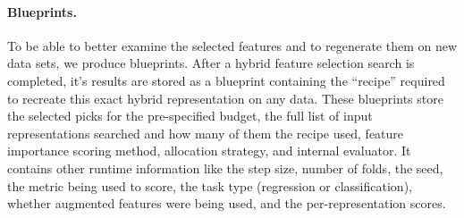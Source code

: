 \paragraph{Blueprints.}

To be able to better examine the selected features and to regenerate them on new data sets, we produce blueprints. After a hybrid feature selection search is completed, it's results are stored as a blueprint containing the ``recipe'' required to recreate this exact hybrid representation on any data. These blueprints store the selected picks for the pre-specified budget,  the full list of input representations searched and how many of them the recipe used, feature importance scoring method, allocation strategy, and internal evaluator. It contains other runtime information like the step size, number of folds, the seed, the metric being used to score, the task type (regression or classification), whether augmented features were being used, and the per-representation scores.

